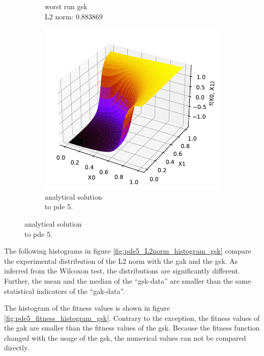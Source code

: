 \documentclass[./\jobname.tex]{subfiles}
\begin{document}
\begin{figure}[H]
\begin{subfigure}[b]{0.3333\linewidth}
		\caption{worst run \gls{gsk} \\L2 norm: 0.883869}
		\label{fig:pde5_ex3_best_solution_adaptive}
	\end{subfigure}%
	\begin{subfigure}[b]{0.3333\linewidth}
		\centering
		\includegraphics[width=1\textwidth]{../../code/testbed/pde5/sol_pde_5.pdf}
		\caption{analytical solution \\to \gls{pde} 5.}
		\label{fig:pde5_analytical_solution_3}
	\end{subfigure}%
	\label{fig:pde5_ex3_compare_best_worst}
\end{figure}

The following histograms in figure \ref{fig:pde5_L2norm_histogram_gsk} compare the experimental distribution of the L2 norm with the \gls{gak} and the \gls{gsk}. As inferred from the Wilcoxon test, the distributions are significantly different. Further, the mean and the median of the ``\gls{gsk}-data'' are smaller than the same statistical indicators of the ``\gls{gak}-data''. 

The histogram of the fitness values is shown in figure \ref{fig:pde5_fitness_histogram_gsk}. Contrary to the exception, the fitness values of the \gls{gak} are smaller than the fitness values of the \gls{gsk}. Because the fitness function changed with the usage of the \gls{gsk}, the numerical values can not be compared directly. 
\end{document}
